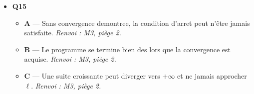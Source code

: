 \begin{itemize}
\begin{itemize}
  \end{itemize}
  \item \textbf{Q15}
  \begin{itemize}
    \item \textbf{A} — Sans convergence demontree, la condition d'arret peut n'être jamais satisfaite. \emph{Renvoi : M3, piège 2.}
    \item \textbf{B} — Le programme se termine bien des lors que la convergence est acquise. \emph{Renvoi : M3, piège 2.}
    \item \textbf{C} — Une suite croissante peut diverger vers $+\infty$ et ne jamais approcher $\ell$. \emph{Renvoi : M3, piège 2.}
  \end{itemize}
\end{itemize}
\fi

